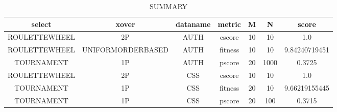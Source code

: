 \begin{table}[H]
\centering
\caption{SUMMARY}
\begin{adjustbox}{width=1\textwidth}
\begin{tabular}{ |c|c|c|c|c|c|c| }
\hline
select & xover & dataname & metric & M & N & score\\
\hline
\hline
ROULETTEWHEEL & 2P & AUTH & cscore & 10 & 10 & 1.0\\
\hline
ROULETTEWHEEL & UNIFORMORDERBASED & AUTH & fitness & 10 & 10 & 9.84240719451\\
\hline
TOURNAMENT & 1P & AUTH & pscore & 20 & 1000 & 0.3725\\
\hline
ROULETTEWHEEL & 2P & CSS & cscore & 10 & 10 & 1.0\\
\hline
TOURNAMENT & 1P & CSS & fitness & 20 & 10 & 9.66219155445\\
\hline
TOURNAMENT & 1P & CSS & pscore & 20 & 100 & 0.3715\\
\hline
\end{tabular}
\end{adjustbox}
\end{table}
